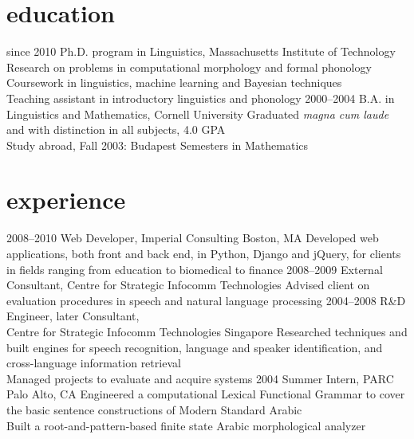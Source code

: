 \documentclass[]{friggeri-cv}
\begin{document}
\section{education}

\begin{entrylist}
  \entry
    {since 2010}
    {Ph.D. program in Linguistics, Massachusetts Institute of Technology}
    {}
    {%
     Research on problems in computational morphology and formal phonology \\
     Coursework in linguistics, machine learning and Bayesian techniques   \\
     Teaching assistant in introductory linguistics and phonology
    }
  \entry
    {2000--2004}
    {B.A. in Linguistics and Mathematics, Cornell University}
    {}
    {Graduated \emph{magna cum laude} and with distinction in all subjects, 4.0 GPA \\
	Study abroad, Fall 2003: Budapest Semesters in Mathematics}
\end{entrylist}

\section{experience}

\begin{entrylist}
  \entry
    {2008--2010}
    {Web Developer, Imperial Consulting}
    {Boston, MA}
    {Developed web applications, both front and back end, in Python, Django and jQuery,
     for clients in fields ranging from education to biomedical to finance}
  \entry
    {2008--2009}
    {External Consultant, Centre for Strategic Infocomm Technologies}
    {}
    {Advised client on evaluation procedures in speech and natural language processing}
  \entry
    {2004--2008}
    {R\&D Engineer, later Consultant, \\ Centre for Strategic Infocomm Technologies}
    {Singapore}
    {Researched techniques and built engines for speech recognition, language and speaker identification, and cross-language information retrieval \\
    Managed projects to evaluate and acquire systems}
  \entry
    {2004}
    {Summer Intern, PARC}
    {Palo Alto, CA}
    {Engineered a computational Lexical Functional Grammar to cover the basic sentence constructions of Modern Standard Arabic \\
Built a root-and-pattern-based finite state Arabic morphological analyzer}
\end{entrylist}
\end{document}
